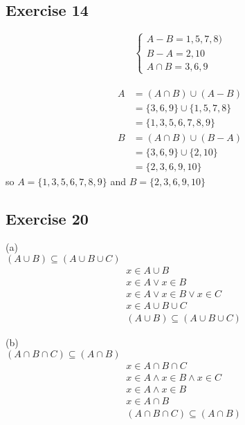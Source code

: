 \documentclass[12pt]{article}
\begin{document}
\subsection*{Exercise 14}
$$ 
\left\{
\begin{aligned}
A-B={1,5,7,8)} \\
B-A={2,10}\\
A\cap B={3,6,9}
\end{aligned}
\right.
$$
\\
\begin{equation}\nonumber
    \begin{split}
        A & =(A\cap B)\cup (A-B)\\
           & =\{3,6,9\}\cup \{1,5,7,8\}\\
           & =\{1,3,5,6,7,8,9\}\\
        B & =(A\cap B)\cup (B-A)\\
           & =\{3,6,9\}\cup \{2,10\}\\
           & =\{2,3,6,9,10\}
    \end{split}
\end{equation}
so $A=\{1,3,5,6,7,8,9\}$ and $B=\{2,3,6,9,10\}$\\

\subsection*{Exercise 20}
(a)\\
$(A\cup B)\subseteq (A\cup B\cup C)$\\
\begin{equation}\nonumber
    \begin{split}
    &x\in A \cup B\\
    &x\in A\lor x\in B\\
    &x\in A\lor x\in B\lor x\in C\\
    &x\in A\cup B\cup C\\
    &(A\cup B)\subseteq (A\cup B\cup C)
    \end{split}
\end{equation}

(b)\\
$(A\cap B\cap C)\subseteq (A\cap B)$\\
\begin{equation}\nonumber
    \begin{split}
    &x\in A\cap B\cap C\\
    &x\in A\land x\in B\land x\in C\\
    &x\in A\land x\in B\\
    &x\in A\cap B\\
    &(A\cap B\cap C)\subseteq (A\cap B)
    \end{split}
\end{equation}
\end{document}
